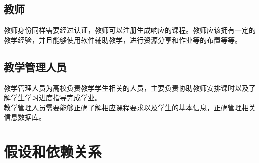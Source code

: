 \subsection{教师}
教师身份同样需要经过认证，教师可以注册生成响应的课程。教师应该拥有一定的教学经验，并且能够使用软件辅助教学，进行资源分享和作业等的布置等等。
\subsection{教学管理人员}
教学管理人员为高校负责教学学生相关的人员，主要负责协助教师安排课时以及了解学生学习进度指导完成学业。\\
教学管理人员需要能够正确了解相应课程要求以及学生的基本信息，正确管理相关信息数据库。

\section{假设和依赖关系}
